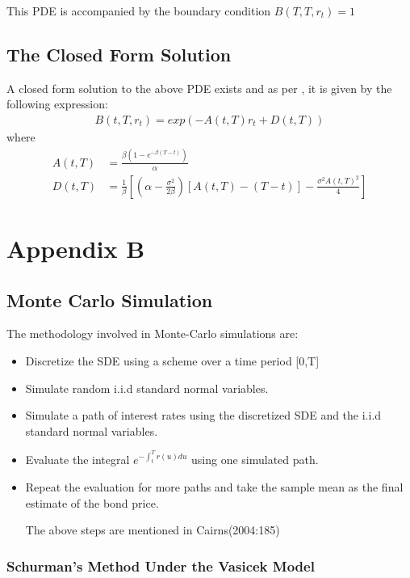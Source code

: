 \documentclass[12pt,a4paper]{article}
\begin{document}
	\noindent This PDE is accompanied by the boundary condition $B(T,T,r_t) = 1$
	\subsection{The Closed Form Solution}
	\label{subsec: Closed Form}
	
	A closed form solution to the above PDE exists and as per \cite{mamon2004three}, it is given by the following expression:
	\begin{gather*}
	\boxed{B(t,T,r_t) =exp(-A(t,T)r_t+D(t,T))}
	\end{gather*}
	where
	\begin{align*}
	A(t,T)&=\frac{\beta(1-e^{-\beta(T-t)})}{\alpha}\\
	D(t,T)&=\frac{1}{\beta}\left[\left(\alpha-\frac{\sigma^2}{2\beta}\right)[A(t,T)-(T-t)]-\frac{\sigma^2A(t,T)^2}{4}\right]
	\end{align*}
	
	\newpage
	\section{Appendix B}
	\label{sec: Appendix B}
	\subsection{Monte Carlo Simulation}
	\label{subsec: MC}
	The methodology involved in Monte-Carlo simulations are:
	
	\begin{itemize}
		\item Discretize the SDE using a scheme over a time period [0,T]
		\item Simulate random i.i.d standard normal variables.
		\item Simulate a path of interest rates using the discretized SDE and the i.i.d standard normal variables.
		\item Evaluate the integral $e^{-\int_{t}^{T} r(u)du}$ using one simulated path.
		\item Repeat the evaluation for more paths and take the sample mean as the final estimate of the bond price.
		
		The above steps are mentioned in Cairns(2004:185)
	\end{itemize}
	
	
	
	\subsubsection{Schurman's Method Under the Vasicek Model}
	\label{subsubsec: Schurman}
	
\end{document}
